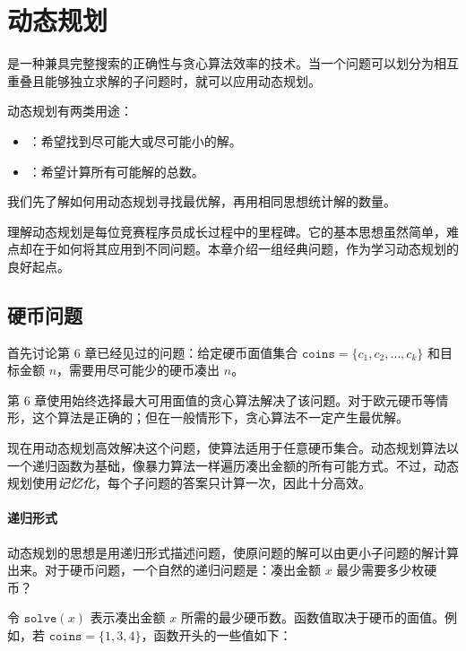 \chapter{动态规划}


是一种兼具完整搜索的正确性与贪心算法效率的技术。当一个问题可以划分为相互重叠且能够独立求解的子问题时，就可以应用动态规划。

动态规划有两类用途：

\begin{itemize}
\item
{}：希望找到尽可能大或尽可能小的解。
\item
{}：希望计算所有可能解的总数。
\end{itemize}

我们先了解如何用动态规划寻找最优解，再用相同思想统计解的数量。

理解动态规划是每位竞赛程序员成长过程中的里程碑。它的基本思想虽然简单，难点却在于如何将其应用到不同问题。本章介绍一组经典问题，作为学习动态规划的良好起点。

\section{硬币问题}

首先讨论第 6 章已经见过的问题：给定硬币面值集合 $\texttt{coins}=\{c_1,c_2,\ldots,c_k\}$ 和目标金额 $n$，需要用尽可能少的硬币凑出 $n$。

第 6 章使用始终选择最大可用面值的贪心算法解决了该问题。对于欧元硬币等情形，这个算法是正确的；但在一般情形下，贪心算法不一定产生最优解。

现在用动态规划高效解决这个问题，使算法适用于任意硬币集合。动态规划算法以一个递归函数为基础，像暴力算法一样遍历凑出金额的所有可能方式。不过，动态规划使用\emph{记忆化}，每个子问题的答案只计算一次，因此十分高效。

\subsubsection{递归形式}

动态规划的思想是用递归形式描述问题，使原问题的解可以由更小子问题的解计算出来。对于硬币问题，一个自然的递归问题是：凑出金额 $x$ 最少需要多少枚硬币？

令 $\texttt{solve}(x)$ 表示凑出金额 $x$ 所需的最少硬币数。函数值取决于硬币的面值。例如，若 $\texttt{coins}=\{1,3,4\}$，函数开头的一些值如下：

